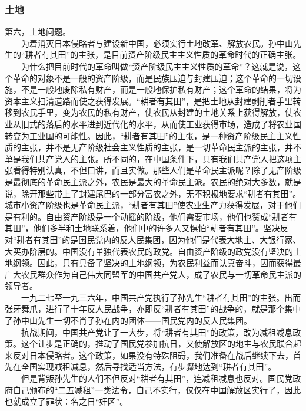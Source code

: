 \documentclass[cn,11pt,chinese]{elegantbook}
\def\myformat#1{\hfil\hfil #1}
\begin{document}
\subsubsection*{\myformat{土地}}
第六，土地问题。\\
　　为着消灭日本侵略者与建设新中国，必须实行土地改革、解放农民。孙中山先生的“耕者有其田”的主张，是目前资产阶级民主主义性质的革命时代的正确主张。\\
　　为什么把目前时代的革命叫做“资产阶级民主主义性质的革命”？这就是说，这个革命的对象不是一般的资产阶级，而是民族压迫与封建压迫；这个革命的一切设施，不是一般地废除私有财产，而是一般地保护私有财产；这个革命的结果，将为资本主义扫清道路而使之获得发展。“耕者有其田”，是把土地从封建剥削者手里转移到农民手里，变为农民的私有财产，使农民从封建的土地关系上获得解放，使农业从旧式的落后的水平进到近代化的水平，从而使工业获得市场，造成了将农业国转变为工业国的可能性。因此，“耕者有其田”的主张，是一种资产阶级民主主义性质的主张，并不是无产阶级社会主义性质的主张，是一切革命民主派的主张，并不单是我们共产党人的主张。所不同的，在中国条件下，只有我们共产党人把这项主张看得特别认真，不但口讲，而且实做。那些人们是革命民主派呢？除了无产阶级是最彻底的革命民主派之外，农民是最大的革命民主派。农民的绝对大多数，就是说，除开那些带上了封建尾巴的一部分富农之外，无不积极地要求“耕者有其田”。城市小资产阶级也是革命民主派，“耕者有其田”使农业生产力获得发展，对于他们是有利的。自由资产阶级是一个动摇的阶级，他们需要市场，他们也赞成“耕者有其田”，他们多半和土地联系着，他们中的许多人又惧怕“耕者有其田”。坚决反对“耕者有其田”的是国民党内的反人民集团，因为他们是代表大地主、大银行家、大买办阶层的。中国没有单独代表农民的政党。自由资产阶级的政党没有坚决的土地纲领。因此，只有具备了坚决的土地纲领，为农民利益而认真奋斗，因而获得最广大农民群众作为自己伟大同盟军的中国共产党人，成了农民与一切革命民主派的领导者。\\
　　一九二七至一九三六年，中国共产党执行了孙先生“耕者有其田”的主张。出而张牙舞爪，进行了十年反人民战争，亦即反“耕者有其田”的战争的，就是那个集中了孙中山先生一切不肖子孙在内的团体——国民党内的反人民集团。\\
　　抗战期间，中国共产党让了一大步，将“耕者有其田”的政策，改为减租减息政策。这个让步是正确的，推动了国民党参加抗日，又使解放区的地主与农民联合起来反对日本侵略者。这个政策，如果没有特殊阻碍，我们准备在战后继续下去，首先在全国实现减租减息，然后寻找适当方法，有步骤地达到“耕者有其田”。\\
　　但是背叛孙先生的人们不但反对“耕者有其田”，连减租减息也反对。国民党政府自己颁布的“二五减租”一类法令，自己不实行，仅仅在中国解放区实行了，因此也就成立了罪状：名之日“奸区”。\\
\end{document}
